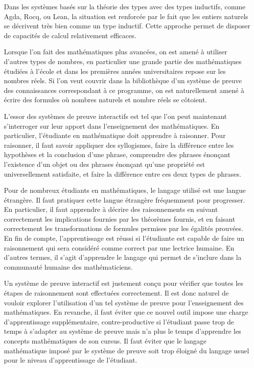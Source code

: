 \documentclass{jflart}
\begin{document}
Dans les systèmes basés sur la théorie des types avec des types
inductifs, comme Agda, Rocq, ou Lean, la situation est renforcée par
le fait que les entiers naturels se décrivent très bien comme un type
inductif.  Cette approche permet de disposer de capacités de calcul
relativement efficaces.

Lorsque l'on fait des mathématiques plus avancées, on est amené à
utiliser d'autres types de nombres, en particulier une grande partie
des mathématiques étudiées à l'école et dans les premières années
universitaires repose sur les nombres réels.  Si l'on veut couvrir
dans la bibliothèque d'un système de preuve des connaissances
correspondant à ce programme, on est naturellement amené à écrire des
formules où nombres naturels et nombre réels se côtoient.

L'essor des systèmes de preuve interactifs est tel que l'on peut
maintenant s'interroger sur leur apport dans l'enseignement des
mathématiques.  En particulier, l'étudiante en mathématique doit apprendre à
raisonner.  Pour raisonner, il faut savoir appliquer des
syllogismes, faire la différence entre les hypothèses et la conclusion
d'une phrase, comprendre des phrases énonçant l'existence d'un objet
ou des phrases énonçant qu'une propriété est universellement
satisfaite, et faire la différence entre ces deux types de phrases.

Pour de nombreux étudiants en mathématiques, le langage utilisé est
une langue étrangère.  Il faut pratiquer cette langue étrangère
fréquemment pour progresser.  En particulier, il faut apprendre à décrire
des raisonnements en suivant correctement les implications fournies par
les théorèmes fournis, et en faisant correctement les transformations
de formules permises par les égalités prouvées.  En fin de compte,
l'apprentissage est réussi si l'étudiante est capable de faire un
raisonnement qui sera considéré comme correct par une lectrice humaine.
En d'autres termes, il s'agit d'apprendre le langage qui permet de
s'inclure dans la communauté humaine des mathématiciens.

Un système de preuve interactif est justement conçu pour vérifier que toutes
les étapes de raisonnement sont effectuées correctement.  Il est donc
naturel de vouloir explorer l'utilisation d'un tel système de preuve
pour l'enseignement des mathématiques.  En revanche, il faut éviter
que ce nouvel outil impose une charge d'apprentissage supplémentaire,
contre-productive si l'étudiant passe trop de temps à
s'adapter au système de preuve mais n'a plus le temps d'apprendre les
concepts mathématiques de son cursus.  Il faut éviter que le langage
mathématique imposé par le système de preuve soit trop éloigné du
langage usuel pour le niveau d'apprentissage de l'étudiant.
\end{document}
